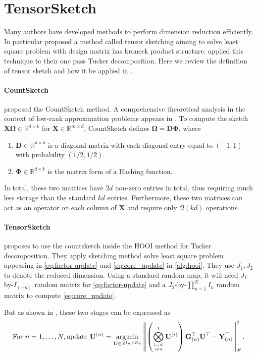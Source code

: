 
\section{TensorSketch} \label{appendix: TensorSketch}
Many authors have developed methods to perform dimension reduction efficiently. In particular 
\cite{2017arXiv171209473D} proposed a method called tensor sketching aiming to solve least square problem with design matrix has kroneck product structure.  \cite{malik2018low} applied this technique to their one pass Tucker decomposition. 
Here we review the definition of tensor sketch and how it be applied in \cite{malik2018low}. 


\paragraph{CountSketch} \cite{cormode2008finding} proposed the \textsf{CountSketch} method.
A comprehensive theoretical analysis in the context of low-rank approximation problems appears in \cite{clarkson2017low}.
To compute the sketch $\mathbf{X}\mathbf{\Omega} \in \mathbb{R}^{d \times k}$ for $\mathbf{X} \in \mathbb{R}^{m \times d}$,
\textsf{CountSketch} defines $\mathbf{\Omega} = \mathbf{D}\mathbf{\Phi}$, where
\begin{enumerate}
	\item $\mathbf{D} \in \mathbb{R}^{d \times d}$ is a diagonal matrix with each diagonal entry equal to $(-1,1)$ with probability $(1/2,1/2)$.
	\item $\mathbf{\Phi} \in \mathbb{R}^{d \times k}$ is the matrix form of a Hashing function.
\end{enumerate}

In total, these two matrices have $2d$ non-zero entries in total, thus requiring much less storage than the standard $kd$ entries. Furthermore, these two matrices can act as an operator on each column of $\mathbf{X}$ and require only $\mathcal{O}(kd)$ operations.

\paragraph{TensorSketch}
\cite{malik2018low} proposes to use the countsketch inside the HOOI method for Tucker decomposition.
They apply sketching method solve least square problem appearing in \eqref{eq:factor-update}  and  \eqref{eq:core_update} in \ref{alg:hooi}. They use $J_1, J_2$ to denote the reduced dimension. Using a standard random map, it will need  $J_1$-by-$I_{(-n)}$ random matrix 
for \ref{eq:factor-update}  
and a $J_2$-by-$\prod_{n = 1}^N I_n$ random matrix to compute \ref{eq:core_update}. \par 
But as shown in \cite{malik2018low}, these two stages can be expressed as  
\begin{equation}\label{eq: tucker-stage-1}
\text{For } n = 1, \dots, N, \text{update } \mathbf{U}^{(n)}=\underset{\mathbf{U} \in \mathbb{R}^{I_{n} \times R_{n}}}{\arg \min }\left\|\left(\bigotimes_{i=N \atop i \neq n}^{1} \mathbf{U}^{(i)}\right) \mathbf{G}_{(n)}^{\top} \mathbf{U}^{\top}-\mathbf{Y}_{(n)}^{\top}\right\|_{F}^{2}.
\end{equation}

